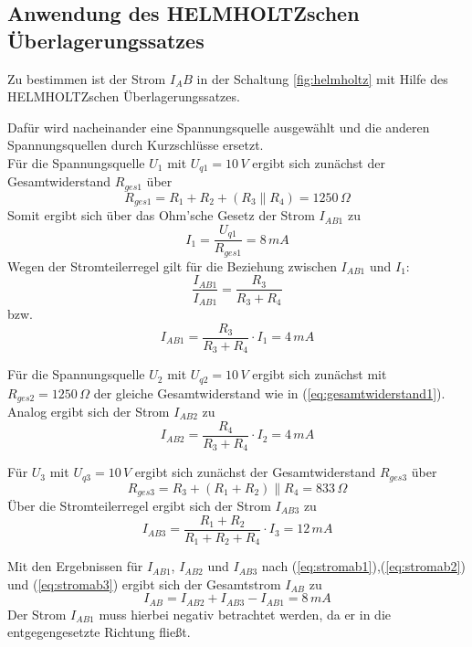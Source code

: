 \subsection{Anwendung des HELMHOLTZschen Überlagerungssatzes}

Zu bestimmen ist der Strom $I_AB$ in der Schaltung \ref{fig:helmholtz} mit Hilfe des HELMHOLTZschen Überlagerungssatzes.

Dafür wird nacheinander eine Spannungsquelle ausgewählt und die anderen Spannungsquellen durch Kurzschlüsse ersetzt.\\
Für die Spannungsquelle $U_1$ mit $U_{q1}=10\,V$ ergibt sich zunächst der Gesamtwiderstand $R_{ges1}$ über
\begin{equation}
    \label{eq:gesamtwiderstand1}
    R_{ges1}=R_1+R_2+(R_3\parallel R_4)=1250\,\Omega
\end{equation}
Somit ergibt sich über das Ohm'sche Gesetz der Strom $I_{AB1}$ zu
\begin{equation*}
    I_{1}=\frac{U_{q1}}{R_{ges1}}=8\,mA
\end{equation*}
Wegen der Stromteilerregel gilt für die Beziehung zwischen $I_{AB1}$ und $I_{1}$:
\begin{equation*}
    \frac{I_{AB1}}{I_{AB1}}=\frac{R_3}{R_3+R_4}
\end{equation*}
bzw.
\begin{equation}
    \label{eq:stromab1}
    I_{AB1}=\frac{R_3}{R_3+R_4}\cdot{I_{1}}=4\,mA
\end{equation}

Für die Spannungsquelle $U_2$ mit $U_{q2}=10\,V$ ergibt sich zunächst mit $R_{ges2} = 1250\,\Omega$ der gleiche Gesamtwiderstand wie in (\ref{eq:gesamtwiderstand1}). Analog ergibt sich der Strom $I_{AB2}$ zu
\begin{equation}
    \label{eq:stromab2}
    I_{AB2}=\frac{R_4}{R_3+R_4}\cdot{I_{2}}=4\,mA
\end{equation}

Für $U_3$ mit $U_{q3}=10\,V$ ergibt sich zunächst der Gesamtwiderstand $R_{ges3}$ über
\begin{equation*}
    R_{ges3}=R_3+(R_1+R_2)\parallel R_4=833\,\Omega
\end{equation*}
Über die Stromteilerregel ergibt sich der Strom $I_{AB3}$ zu
\begin{equation}
    \label{eq:stromab3}
    I_{AB3}=\frac{R_1 + R_2}{R_1+R_2+R_4}\cdot{I_{3}}=12\,mA
\end{equation}

Mit den Ergebnissen für $I_{AB1}$, $I_{AB2}$ und $I_{AB3}$ nach (\ref{eq:stromab1}),(\ref{eq:stromab2}) und (\ref{eq:stromab3})  ergibt sich der Gesamtstrom $I_{AB}$ zu
\begin{equation*}
    I_{AB}=I_{AB2}+I_{AB3}-I_{AB1}=8\,mA
\end{equation*}
Der Strom $I_{AB1}$ muss hierbei negativ betrachtet werden, da er in die entgegengesetzte Richtung fließt.



